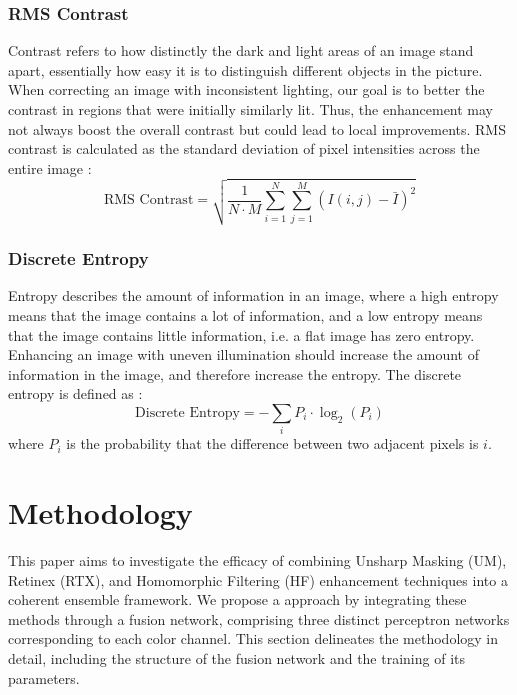\documentclass[sigconf]{acmart}
\begin{document}
\subsubsection{RMS Contrast}\label{sec:rms-contrast}
Contrast refers to how distinctly the dark and light areas of an image stand apart, essentially how easy it is to distinguish different objects in the picture. When correcting an image with inconsistent lighting, our goal is to better the contrast in regions that were initially similarly lit. Thus, the enhancement may not always boost the overall contrast but could lead to local improvements. RMS contrast is calculated as the standard deviation of pixel intensities across the entire image \cite{dey2019uneven}:
\begin{equation}
\text{RMS Contrast} = \sqrt{\frac{1}{N \cdot M} \sum_{i=1}^{N} \sum_{j=1}^{M} (I(i,j) - \bar{I})^2}
\end{equation}

\subsubsection{Discrete Entropy}\label{sec:discrete-entropy}
Entropy describes the amount of information in an image, where a high entropy means that the image contains a lot of information, and a low entropy means that the image contains little information, i.e. a flat image has zero entropy. Enhancing an image with uneven illumination should increase the amount of information in the image, and therefore increase the entropy. The discrete entropy is defined as \cite{dey2019uneven,ye2007discrete}:
\begin{equation}
	\text{Discrete Entropy} = - \sum_{i} P_i \cdot \log_2(P_i)
\end{equation}
where $P_i$ is the probability that the difference between two adjacent pixels is $i$.

\section{Methodology}\label{sec:method}
This paper aims to investigate the efficacy of combining Unsharp Masking (UM), Retinex (RTX), and Homomorphic Filtering (HF) enhancement techniques into a coherent ensemble framework. We propose a approach by integrating these methods through a fusion network, comprising three distinct perceptron networks corresponding to each color channel. This section delineates the methodology in detail, including the structure of the fusion network and the training of its parameters.
\end{document}
